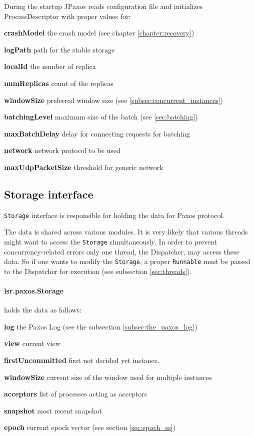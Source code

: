 During the startup JPaxos reads configuration file and initializes ProcessDescriptor with proper values for:
\begin{tightList}[\setlength{\labelwidth}{0em}]
 \item[\textbf{crashModel}] the crash model (see chapter \ref{chapter:recovery})
 \item[\textbf{logPath}] path for the stable storage
 \item[\textbf{localId}] the number of replica
 \item[\textbf{numReplicas}] count of the replicas
 \item[\textbf{windowSize}] preferred window size (see \ref{subsec:concurrent_instances})
 \item[\textbf{batchingLevel}] maximum size of the batch (see \ref{sec:batching})
 \item[\textbf{maxBatchDelay}] delay for connecting requests for batching
 \item[\textbf{network}] network protocol to be used
 \item[\textbf{maxUdpPacketSize}] threshold for generic network
\end{tightList}

\subsection{Storage interface}
\label{subsec:storage_interface}

\texttt{Storage} interface is responsible for holding the data for Paxos
protocol.

The data is shared across various modules.
It is very likely that various threads might want to access the \texttt{Storage} simultaneously. In order to prevent concurrency-related errors only one thread, the Dispatcher, may access these data. So if one wants to modify the \texttt{Storage}, a proper \texttt{Runnable} must be passed to the Dispatcher for execution (see subsection \ref{sec:threads}).

\paragraph{\normalfont \ttfamily lsr.paxos.Storage}
holds the data as follows:
\begin{tightList}[\setlength{\labelwidth}{0em}]
  \item[\textbf{log}] the Paxos Log (see the subsection \ref{subsec:the_paxos_log})
  \item[\textbf{view}] current view
  \item[\textbf{firstUncommitted}] first not decided yet instance.
  \item[\textbf{windowSize}] current size of the window used for multiple instances
  \item[\textbf{acceptors}] list of processes acting as acceptors
  \item[\textbf{snapshot}] most recent snapshot
  \item[\textbf{epoch}] current epoch vector (see section \ref{sec:epoch_ss})
\end{tightList}

